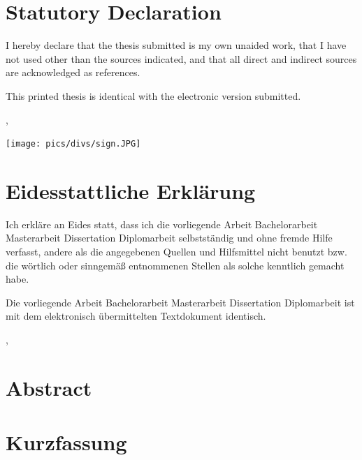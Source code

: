 
\ifeng 
	\chapter*{Statutory Declaration}
	I hereby declare that the thesis submitted is my own unaided work, that I have not used other than the sources indicated, and that all direct and indirect sources are acknowledged as references.

	This printed thesis is identical with the electronic version submitted.

	\vskip2cm
                          
	\place, \date       \hspace*{0pt}\hfill   \texttt{[image: pics/divs/sign.JPG]}



\else 
	\chapter*{Eidesstattliche Erklärung}
	Ich erkläre an Eides statt, dass ich die vorliegende \ifcase\type Arbeit \or Bachelorarbeit \or Masterarbeit \or Dissertation \or Diplomarbeit \fi selbstständig und ohne fremde Hilfe verfasst, andere als die angegebenen Quellen und Hilfsmittel nicht benutzt bzw. die wörtlich oder sinngemäß entnommenen Stellen als solche kenntlich gemacht habe.

	Die vorliegende \ifcase\type Arbeit \or Bachelorarbeit \or Masterarbeit \or Dissertation \or Diplomarbeit \fi ist mit dem elektronisch übermittelten Textdokument identisch.

	\vskip1cm
	\place, \date
\fi


\ifeng
	\chapter*{Abstract}
\else
	\chapter*{Kurzfassung}
\fi


